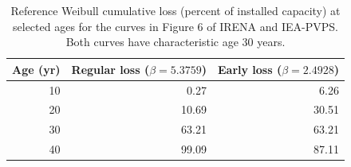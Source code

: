\begin{table}[htbp]\centering\small
\caption{Reference Weibull cumulative loss (percent of installed capacity) at selected ages for the curves in Figure 6 of IRENA and IEA-PVPS. Both curves have characteristic age 30 years.}\label{tab:irena}
\begin{tabular}{rrr}\toprule
Age (yr) & Regular loss ($\beta=5.3759$) & Early loss ($\beta=2.4928$) \\
\midrule
10 & 0.27 & 6.26 \\
20 & 10.69 & 30.51 \\
30 & 63.21 & 63.21 \\
40 & 99.09 & 87.11 \\
\bottomrule\end{tabular}\end{table}
